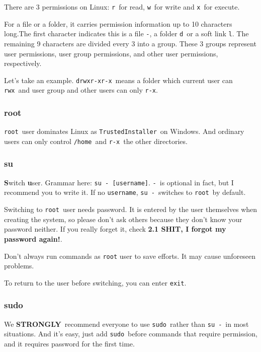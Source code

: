 \documentclass[12pt]{ctexart}
\newenvironment{mdquote}
{%
  \par\noindent
  \begin{list}{}{%
      \setlength{\leftmargin}{1em}%
      \setlength{\rightmargin}{0pt}%
      \setlength{\itemindent}{0pt}%
      \setlength{\listparindent}{\parindent}%
      \setlength{\topsep}{0.5\baselineskip}%
  }
  \item[\textbf{>}\ ]\itshape
}
{\end{list}\par}
\begin{document}
There are 3 permissions on Linux: \texttt{r}\ for read, \texttt{w}\ for
write and \texttt{x}\ for execute.

For a file or a folder, it carries permission information up to 10
characters long.The first character indicates this is a file \texttt{-},
a folder \texttt{d}\ or a soft link \texttt{l}. The remaining 9
characters are divided every 3 into a group. These 3 groups represent
user permissions, user group permissions, and other user permissions,
respectively.

Let's take an example. \texttt{drwxr-xr-x}\ means a
folder which current user can \texttt{rwx}\ and user group and other
users can only \texttt{r-x}.

\subsubsection*{\textbf{root}}

\texttt{root}\ user dominates Linux as \texttt{TrustedInstaller}\ on
Windows. And ordinary users can only control \texttt{/home}\ and
\texttt{r-x}\ the other directories.

\subsubsection*{\textbf{su}}

\textbf{S}witch \textbf{u}ser. Grammar here:
\texttt{su\ -\ {[}username{]}}. \texttt{-}\ is optional in fact, but I
recommend you to write it. If no \texttt{username}, \texttt{su\ -}\
switches to \texttt{root}\ by default.

Switching to \texttt{root}\ user needs password. It is entered by the
user themselves when creating the system, so please
don't ask others because they don't know
your password neither. If you really forget it, check \textbf{2.1 SHIT, 
I forgot my password again!}.

\begin{mdquote}
Don't always run commands as \texttt{root} user to save
efforts. It may cause unforeseen problems.
\end{mdquote}

To return to the user before switching, you can enter \texttt{exit}.

\subsubsection*{\textbf{sudo}}

We \textbf{STRONGLY}\ recommend everyone to use \texttt{sudo}\ rather than
\texttt{su\ -}\ in most situations. And it's easy, just
add \texttt{sudo}\ before commands that require permission, and it
requires password for the first time.
\end{document}
